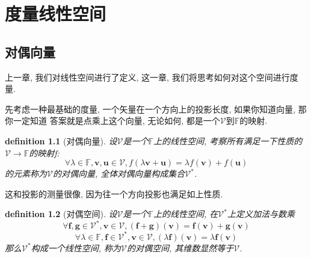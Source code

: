 \documentclass[12pt]{ctexbook}
\newtheorem{definition}{definition}
\numberwithin{definition}{section}
\numberwithin{theorem}{section}
\numberwithin{exercise}{section}
\numberwithin{example}{section}
\numberwithin{lemma}{section}
\begin{document}
    \chapter{度量线性空间}

    \section{对偶向量}

    上一章, 我们对线性空间进行了定义, 这一章, 我们将思考如何对这个空间进行度量.

    先考虑一种最基础的度量, 一个矢量在一个方向上的投影长度, 如果你知道向量, 那你一定知道
    答案就是点乘上这个向量, 无论如何, 都是一个\(\mathcal{V}\)到\(\mathbb{F}\)的映射.

    \begin{definition}
        [对偶向量] 设\(\mathcal{V}\)是一个\(\mathbb{F}\)上的线性空间, 考察所有满足一下性质的\(\mathcal{V} \to \mathbb{F}\)的映射f:
        \begin{equation}
            \forall \lambda \in \mathbb{F}, \boldsymbol{v}, \boldsymbol{u} \in \mathcal{V}, f(\lambda \boldsymbol{v} + \boldsymbol{u}) = \lambda f(\boldsymbol{v}) + f(\boldsymbol{u})
        \end{equation}
        的元素称为\(\mathcal{V}\)的对偶向量, 全体对偶向量构成集合\(\mathcal{V}^*\).
    \end{definition}

    这和投影的测量很像, 因为往一个方向投影也满足如上性质.

    \begin{definition}
        [对偶空间] 设\(\mathcal{V}\)是一个\(\mathbb{F}\)上的线性空间, 在\(\mathcal{V}^*\)上定义加法与数乘
        \begin{equation}
            \forall \boldsymbol{f}, \boldsymbol{g} \in \mathcal{V}^*, \boldsymbol{v} \in \mathcal{V}, (\boldsymbol{f} + \boldsymbol{g}) (\boldsymbol{v}) = \boldsymbol{f}(\boldsymbol{v}) + \boldsymbol{g}(\boldsymbol{v})
        \end{equation}
        \begin{equation}
            \forall \lambda \in \mathbb{F}, \boldsymbol{f} \in \mathcal{V}^*, \boldsymbol{v} \in \mathcal{V}, (\lambda \boldsymbol{f})(\boldsymbol{v}) = \lambda \boldsymbol{f}(\boldsymbol{v})
        \end{equation}
        那么\(\mathcal{V}^*\)构成一个线性空间, 称为\(\mathcal{V}\)的对偶空间, 其维数显然等于\(\mathcal{V}\).
    \end{definition}
    
\end{document}
